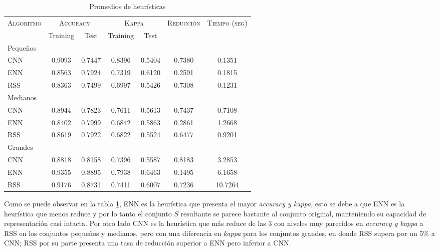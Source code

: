 \begin{table}[h!]
\centering
\begin{tabular}{l c c c c c c}
\hline
\multirow{2}{*}{\textsc{Algoritmo}}
	& \multicolumn{2}{c}{\textsc{Accuracy}}
	& \multicolumn{2}{c}{\textsc{Kappa}}
	& \textsc{Reducción}
	& \textsc{Tiempo (seg)} \\
	& Training & Test
	& Training & Test \\ 
\hline
\hline

Pequeños\\
CNN & 0.9093 & 0.7447 & 0.8396 & 0.5404 & 0.7380 & 0.1351 \\
ENN & 0.8563 & 0.7924 & 0.7319 & 0.6120 & 0.2591 & 0.1815 \\
RSS & 0.8363 & 0.7499 & 0.6997 & 0.5426 & 0.7308 & 0.1231 \\

\hline

Medianos\\
CNN & 0.8944 & 0.7823 & 0.7611 & 0.5613 & 0.7437 & 0.7108 \\
ENN & 0.8402 & 0.7999 & 0.6842 & 0.5863 & 0.2861 & 1.2668 \\
RSS & 0.8619 & 0.7922 & 0.6822 & 0.5524 & 0.6477 & 0.9201 \\

\hline

Grandes\\
CNN & 0.8818 & 0.8158 & 0.7396 & 0.5587 & 0.8183 & 3.2853 \\
ENN & 0.9355 & 0.8895 & 0.7938 & 0.6463 & 0.1495 & 6.1658 \\
RSS & 0.9176 & 0.8731 & 0.7411 & 0.6007 & 0.7236 & 10.7264 \\


\hline
\end{tabular}
\caption{Promedios de heurísticas}
\label{heu}
\end{table}



Como se puede observar en la tabla \ref{heu}, ENN es la heurística que presenta el mayor \emph{accuracy y kappa}, esto se debe a que ENN es la heurística que menos reduce y por lo tanto el conjunto $S$ resultante se parece bastante al conjunto original, manteniendo su capacidad de representación casi intacta. Por otro lado CNN es la heurística que más reduce de las 3 con niveles muy parecidos en \emph{accuracy y kappa} a RSS en los conjuntos pequeños y medianos, pero con una diferencia en \emph{kappa} para los conjuntos grandes, en donde RSS supera por un 5\% a CNN; RSS por su parte presenta una tasa de reducción superior a ENN pero inferior a CNN. 

